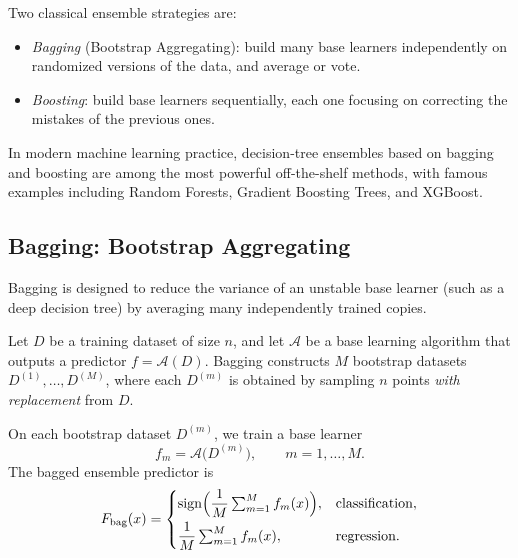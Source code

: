\documentclass[../main]{subfiles}
\begin{document}
Two classical ensemble strategies are:
\begin{itemize}
    \item \emph{Bagging} (Bootstrap Aggregating): build many base learners
    independently on randomized versions of the data, and average or vote.
    \item \emph{Boosting}: build base learners sequentially, each one focusing
    on correcting the mistakes of the previous ones.
\end{itemize}

In modern machine learning practice, decision-tree ensembles based on bagging
and boosting are among the most powerful off-the-shelf methods, with famous
examples including Random Forests, Gradient Boosting Trees, and XGBoost.

\subsection{Bagging: Bootstrap Aggregating}

Bagging is designed to reduce the variance of an unstable base learner (such as
a deep decision tree) by averaging many independently trained copies.

\begin{definition}[Bagging]
    Let $D$ be a training dataset of size $n$, and let $\mathcal{A}$ be a base
    learning algorithm that outputs a predictor $f = \mathcal{A}(D)$.
    Bagging constructs $M$ bootstrap datasets $D^{(1)},\dots,D^{(M)}$, where
    each $D^{(m)}$ is obtained by sampling $n$ points \emph{with replacement}
    from $D$.
    
    On each bootstrap dataset $D^{(m)}$, we train a base learner
    \begin{equation}
        f_m = \mathcal{A}\bigl(D^{(m)}\bigr),
        \qquad m=1,\dots,M.
    \end{equation}
    The bagged ensemble predictor is
    \begin{equation}
        F_{\mathrm{bag}}(x)
        =
        \begin{cases}
            \mathrm{sign}\Bigl(\dfrac{1}{M}\sum_{m=1}^M f_m(x)\Bigr),
                & \text{classification},\\[6pt]
            \dfrac{1}{M}\sum_{m=1}^M f_m(x),
                & \text{regression}.
        \end{cases}
    \end{equation}
\end{definition}
\end{document}
